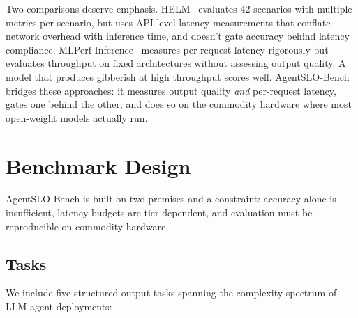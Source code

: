 \documentclass[11pt]{article}
\begin{document}
Two comparisons deserve emphasis.  HELM~\cite{liang2023helm} evaluates 42 scenarios with multiple metrics per scenario, but uses API-level latency measurements that conflate network overhead with inference time, and doesn't gate accuracy behind latency compliance.  MLPerf Inference~\cite{reddi2020mlperf} measures per-request latency rigorously but evaluates throughput on fixed architectures without assessing output quality.  A model that produces gibberish at high throughput scores well.  AgentSLO-Bench bridges these approaches: it measures output quality \emph{and} per-request latency, gates one behind the other, and does so on the commodity hardware where most open-weight models actually run.

\section{Benchmark Design}

AgentSLO-Bench is built on two premises and a constraint: accuracy alone is insufficient, latency budgets are tier-dependent, and evaluation must be reproducible on commodity hardware.

\subsection{Tasks}

We include five structured-output tasks spanning the complexity spectrum of LLM agent deployments:
\end{document}
